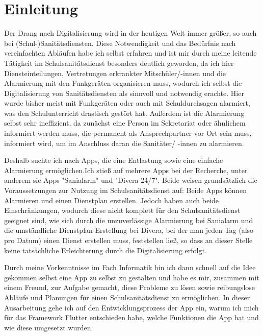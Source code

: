 \documentclass[12pt]{article}
\begin{document}
\newpage
\section{Einleitung}
\setcounter{page}{4}
    Der Drang nach Digitalisierung wird in der heutigen Welt immer größer, so auch bei 
    (Schul-)Sanitätsdiensten. 
    Diese Notwendigkeit und das Bedürfnis nach vereinfachten Abläufen habe ich selbst 
    erfahren und ist mir durch meine leitende Tätigkeit im Schulsanitätsdienst besonders 
    deutlich geworden, da ich hier Diensteinteilungen, Vertretungen erkrankter 
    Mitschüler/-innen und die Alarmierung mit den Funkgeräten organisieren muss, wodurch
    ich selbst die Digitalisierung von Sanitätsdiensten als sinnvoll und notwendig erachte.
    Hier wurde bisher meist mit Funkgeräten oder auch mit Schuldurchsagen alarmiert, was
    den Schulunterricht drastisch gestört hat.
    Außerdem ist die Alarmierung selbst sehr ineffizient, da zunächst eine Person 
    im Sekretariat oder ähnlichem informiert werden muss, die permanent als 
    Ansprechpartner vor Ort sein muss, informiert wird, um im Anschluss daran die 
    Sanitäter/ -innen zu alarmieren.

    Deshalb suchte ich nach Apps, die eine Entlastung sowie eine einfache Alarmierung 
    ermöglichen.Ich stieß auf mehrere Apps bei der Recherche, unter anderem sie Apps 
    "Sanialarm" und "Divera 24/7". Beide weisen grundsätzlich die Voraussetzungen zur 
    Nutzung im Schulsanitätsdienst auf: Beide Apps können Alarmieren und einen Dienstplan
    erstellen. Jedoch haben  auch beide Einschränkungen, wodurch diese nicht komplett 
    für den Schulsanitätsdienst geeignet sind, wie sich durch die unzuverlässige 
    Alarmierung bei Sanialarm und die umständliche Dienstplan-Erstellung bei Divera, bei 
    der man jeden Tag (also pro Datum) einen Dienst erstellen muss, feststellen ließ, 
    so dass an dieser Stelle keine tatsächliche Erleichterung durch die 
    Digitalisierung erfolgt. 

    Durch meine Vorkenntnisse im Fach Informatik bin ich dann schnell auf die Idee gekommen
    selbst eine App zu selbst zu gestalten und habe es mir, zusammen mit einem
    Freund, zur Aufgabe gemacht, diese Probleme zu lösen sowie reibungslose Abläufe und
    Planungen für einen Schulsanitätsdienst zu ermöglichen.
    In dieser Ausarbeitung gehe ich auf den Entwicklungsprozess der App ein, warum ich 
    mich für das Framework Flutter entschieden habe, welche Funktionen die App hat und wie
    diese umgesetzt wurden.
    
\end{document}
